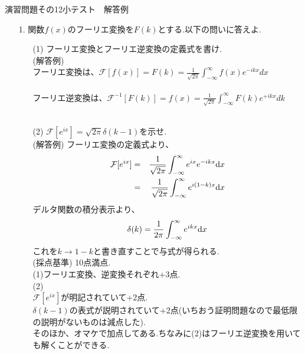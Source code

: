 \documentclass[11pt]{jarticle}
\begin{document}
\newpage
\begin{center}
{\Large
演習問題その12小テスト　解答例}\\
\end{center}
\begin{enumerate}
\item[1.]関数$f(x)$のフーリエ変換を$F(k)$とする.以下の問いに答えよ.
\begin{enumerate}
\item[(1)] フーリエ変換とフーリエ逆変換の定義式を書け.\\
(解答例)\\
フーリエ変換は、$\displaystyle{\mathcal{F}[f(x)]=F(k)=\frac{1}{\sqrt{2\pi}}\int_{-\infty}^{\infty} f(x) e^{-ik x}dx}$\\
\\
フーリエ逆変換は、$\displaystyle{{\mathcal{F}}^{-1}[F(k)]=f(x)=\frac{1}{\sqrt{2\pi}}\int_{-\infty}^{\infty} F(k) e^{+ik x}dk}$\\
\\

\item[(2)] $\mathcal{F}[e^{ix}]=\sqrt{2\pi}\delta (k-1)$を示せ.
\\
(解答例)
フーリエ変換の定義式より、
\begin{eqnarray*}
\mathcal{F}[e^{ix}] &=& \frac{1}{\sqrt{2\pi}}\int_{-\infty}^{\infty} e^{ix}e^{-ikx}{\rm d}x\\
&=& \frac{1}{\sqrt{2\pi}}\int_{-\infty}^{\infty} e^{i(1-k)x}{\rm d}x
\end{eqnarray*}
デルタ関数の積分表示より、
\[\delta (k)=\frac{1}{2\pi}\int_{-\infty}^{\infty}e^{ikx}{\rm d}x\]
これを$k\rightarrow 1-k$と書き直すことで与式が得られる.\\

\newpage
(採点基準) 10点満点.\\
(1)フーリエ変換、逆変換それぞれ+3点.\\
(2)\\
$\mathcal{F}[e^{ix}]$が明記されていて+2点.\\
$\delta (k-1)$の表式が説明されていて+2点(いちおう証明問題なので最低限の説明がないものは減点した).\\
そのほか、オマケで加点してある.ちなみに(2)はフーリエ逆変換を用いても解くことができる.

\end{enumerate}

\end{enumerate}

\newpage
\end{document}
